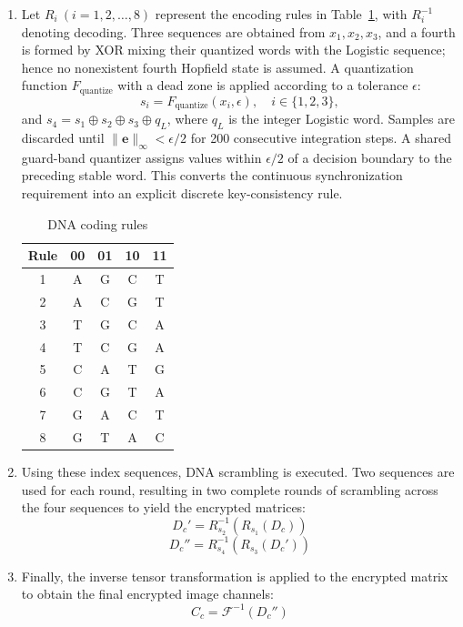 \documentclass[10pt,twocolumn]{article}
\newcommand{\rev}[1]{{\color{revisionblue}#1}}
\theoremstyle{definition}
\begin{document}
\begin{enumerate}
Through this circular structure, any minute pixel perturbation in a single channel will be propagated to all channels during the subsequent diffusion and looping process, thereby effectively resisting differential attacks.

\item 
	Let $R_i \ (i=1,2,\dots,8)$ represent the encoding rules in Table~\ref{tab:dna_rules}, with $R_i^{-1}$ denoting decoding. \rev{Three sequences are obtained from $x_1,x_2,x_3$, and a fourth is formed by XOR mixing their quantized words with the Logistic sequence; hence no nonexistent fourth Hopfield state is assumed.} A quantization function $F_{\text{quantize}}$ with a dead zone is applied according to a tolerance $\epsilon$:
\begin{equation}
	s_i = F_{\text{quantize}}(x_i, \epsilon), \quad i \in \{1, 2, 3\},
\end{equation}
\rev{and $s_4=s_1\oplus s_2\oplus s_3\oplus q_L$, where $q_L$ is the integer Logistic word. Samples are discarded until $\|\mathbf e\|_\infty<\epsilon/2$ for 200 consecutive integration steps. A shared guard-band quantizer assigns values within $\epsilon/2$ of a decision boundary to the preceding stable word. This converts the continuous synchronization requirement into an explicit discrete key-consistency rule.}

\begin{table}[htbp]
		\centering
		\caption{DNA coding rules}
		\label{tab:dna_rules}
		\begin{tabular}{c|cccc}
				\hline
				Rule & 00 & 01 & 10 & 11 \\
				\hline
				1 & A & G & C & T \\
				2 & A & C & G & T \\
				3 & T & G & C & A \\
				4 & T & C & G & A \\
				5 & C & A & T & G \\
				6 & C & G & T & A \\
				7 & G & A & C & T \\
				8 & G & T & A & C \\
				\hline
		\end{tabular}
\end{table}
	
\item
Using these index sequences, DNA scrambling is executed. Two sequences are used for each round, resulting in two complete rounds of scrambling across the four sequences to yield the encrypted matrices:
\begin{equation}
	D_c' = R_{s_2}^{-1}(R_{s_1}(D_c))
\end{equation}
\begin{equation}
	D_c'' = R_{s_4}^{-1}(R_{s_3}(D_c'))
\end{equation}

\item
Finally, the inverse tensor transformation is applied to the encrypted matrix to obtain the final encrypted image channels:
\begin{equation}
	C_c = \mathcal{F}^{-1}(D_c'')
\end{equation}

\end{enumerate}
\end{document}
